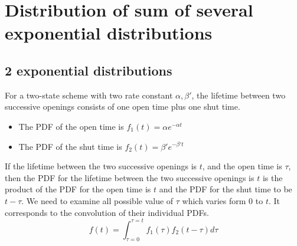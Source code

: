 %



\section{Distribution of sum of several exponential distributions}
\label{sec:distr-sum-some}

\subsection{ 2 exponential distributions}
\label{sec:distribution-sum-2}


For a two-state scheme with two rate constant $\alpha, \beta'$, the
lifetime between two successive openings consists of one open time
plus one shut time.
\begin{itemize}
\item The PDF of the open time is $f_1(t) = \alpha e^{-\alpha t}$
\item The PDF of the shut time is $f_2(t) = \beta' e^{-\beta' t}$
\end{itemize}
If the lifetime between the two successive openings is $t$, and the
open time is $\tau$, then the PDF for the lifetime between the two
successive openings is $t$ is the product of the PDF for the open time
is $t$ and the PDF for the shut time to be $t-\tau$. We need to
examine all possible value of $\tau$ which varies form 0 to $t$.  It
corresponds to the convolution of their individual PDFs.
\begin{equation}
  \label{eq:917}
  f(t) = \int_{\tau=0}^{\tau=t}f_1(\tau)f_2(t-\tau)d\tau
\end{equation}

